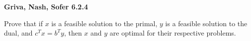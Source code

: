 \textbf{Griva, Nash, Sofer 6.2.4}

Prove that if $x$ is a feasible solution to the primal, $y$ is a feasible solution to the dual, and $c^Tx = b^Ty$, then
$x$ and $y$ are optimal for their respective problems.

\begin{solution}
  \ \\
  \vfill
\end{solution}
